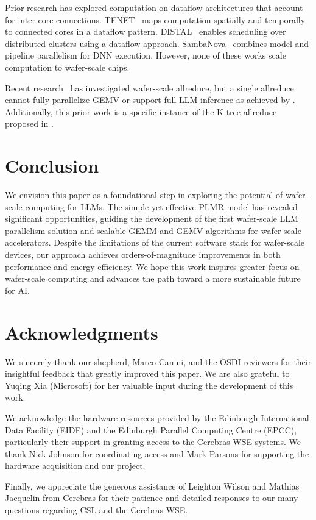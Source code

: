 Prior research has explored computation on dataflow architectures that account for inter-core connections. TENET~\cite{tenet} maps computation spatially and temporally to connected cores in a dataflow pattern. DISTAL~\cite{distal} enables scheduling over distributed clusters using a dataflow approach. SambaNova~\cite{sambanova} combines model and pipeline parallelism for DNN execution. However, none of these works scale computation to wafer-scale chips.

 Recent research~\cite{wafer-reduce} has investigated wafer-scale allreduce, but a single allreduce cannot fully parallelize GEMV or support full LLM inference as achieved by \sys. Additionally, this prior work is a specific instance of the K-tree allreduce proposed in \sys.

\vspace{-0.3cm}
\section{Conclusion}

We envision this paper as a foundational step in exploring the potential of wafer-scale computing for LLMs. The simple yet effective PLMR model has revealed significant opportunities, guiding the development of the first wafer-scale LLM parallelism solution and scalable GEMM and GEMV algorithms for wafer-scale accelerators. Despite the limitations of the current software stack for wafer-scale devices, our approach achieves orders-of-magnitude improvements in both performance and energy efficiency. We hope this work inspires greater focus on wafer-scale computing and advances the path toward a more sustainable future for AI.

\vspace{-0.3cm}
\section{Acknowledgments}

We sincerely thank our shepherd, Marco Canini, and the OSDI reviewers for their insightful feedback that greatly improved this paper. We are also grateful to Yuqing Xia (Microsoft) for her valuable input during the development of this work. 

We acknowledge the hardware resources provided by the Edinburgh International Data Facility (EIDF) and the Edinburgh Parallel Computing Centre (EPCC), particularly their support in granting access to the Cerebras WSE systems. We thank Nick Johnson for coordinating access and Mark Parsons for supporting the hardware acquisition and our project.

Finally, we appreciate the generous assistance of Leighton Wilson and Mathias Jacquelin from Cerebras for their patience and detailed responses to our many questions regarding CSL and the Cerebras WSE.